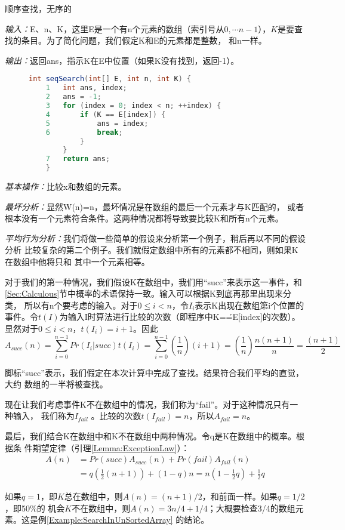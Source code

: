 \begin{algorithm}\label{Algo:SequentialSearch}
顺序查找，无序的

\emph{输入：}E、n、K，这里E是一个有n个元素的数组（索引号从$0, \cdots
n-1$），$K$是要查找的条目。为了简化问题，我们假定K和E的元素都是整数，
和n一样。

\emph{输出：}返回ans，指示K在E中位置（如果K没有找到，返回-1）。
\begin{figure}
\begin{lstlisting}[language={Java},keywordstyle=\color{blue!70}, commentstyle=\color{red!50!green!50!blue!50}]
    int seqSearch(int[] E, int n, int K) {
    1   int ans, index;
    2   ans = -1;
    3   for (index = 0; index < n; ++index) {
    4       if (K == E[index]) {
    5           ans = index;
    6           break;
            }
        }
    7   return ans;
    }
\end{lstlisting}
\end{figure}

\emph{基本操作：}比较x和数组的元素。

\emph{最坏分析：}显然W(n)=n，最坏情况是在数组的最后一个元素才与K匹配的，
或者根本没有一个元素符合条件。这两种情况都将导致要比较K和所有n个元素。

\emph{平均行为分析：}我们将做一些简单的假设来分析第一个例子，稍后再以不同的假设分析
比较复杂的第二个例子。我们就假定数组中所有的元素都不相同，则如果K在数组中他将只和
其中一个元素相等。

对于我们的第一种情况，我们假设K在数组中，我们用“succ”来表示这一事件，和
\ref{Sec:Calculous}节中概率的术语保持一致。输入可以根据K到底再那里出现来分类，
所以有n个要考虑的输入。对于$0\leq i <n$，令$I_i$表示K出现在数组第i个位置的
事件。令$t(I)$为输入I时算法进行比较的次数（即程序中K=\'=E[index]的次数）。
显然对于$0\leq i <n$，$t(I_i)=i+1$。因此
\begin{displaymath}
A_{succ}(n)=\sum_{i=0}^{n-1}Pr(I_i|succ)t(I_i)=\sum_{i=0}^{n-1}(\frac{1}{n})(i+1)=(\frac{1}{n})\frac{n(n+1)}{n}=\frac{(n+1)}{2}
\end{displaymath}

脚标“succ”表示，我们假定在本次计算中完成了查找。结果符合我们平均的直觉，大约
数组的一半将被查找。

现在让我们考虑事件K不在数组中的情况，我们称为“fail”。对于这种情况只有一种输入，
我们称为$I_{fail}$ 。比较的次数$t(I_{fail})=n$，所以$A_{fail}=n$。

最后，我们结合K在数组中和K不在数组中两种情况。令q是K在数组中的概率。根据条
件期望定律（引理\ref{Lemma:ExceptionLaw}）：
\begin{displaymath}
    \begin{aligned}
    A(n)&=Pr(succ)A_{succ}(n)+Pr(fail)A_{fail}(n)\\
        &=q(\frac{1}{2}(n+1))+(1-q)n=n(1-\frac{1}{2}q)+\frac{1}{2}q
    \end{aligned}
\end{displaymath}

如果$q=1$，即$K$总在数组中，则$A(n)=(n+1)/2$，和前面一样。如果$q=1/2$，即50\%的
机会$K$不在数组中，则$A(n)=3n/4+1/4$；大概要检查3/4的数组元素。这是例\ref{Example:SearchInUnSortedArray}
的结论。
\end{algorithm}

